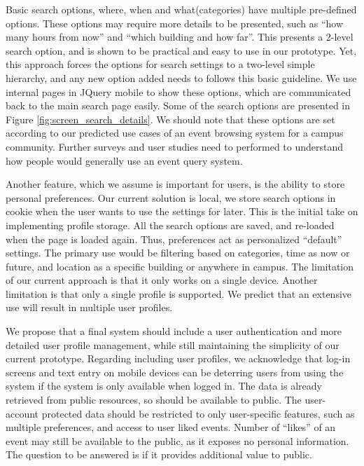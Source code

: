 \documentclass{acm_proc_article-sp}
\begin{document}
Basic search options, where, when and what(categories) have multiple pre-defined options.
These options may require more details to be presented, such as "`how many hours from now"' and "`which building and how far"'.
This presents a 2-level search option, and is shown to be practical and easy to use in our prototype.
Yet, this approach forces the options for search settings to a two-level simple hierarchy, and any new option added
  needs to follows this basic guideline.
We use internal pages in JQuery mobile to show these options, which are communicated back to the main search page easily.
Some of the search options are presented in Figure \ref{fig:screen_search_details}.
We should note that these options are set according to our predicted use cases of an event browsing system for a campus community.
Further surveys and user studies need to performed to understand how people would generally use an event query system.

Another feature, which we assume is important for users, is the ability to store personal preferences.
Our current solution is local, we store search options in cookie when the user wants to use the settings for later.
This is the initial take on implementing profile storage.
All the search options are saved, and re-loaded when the page is loaded again.
Thus, preferences act as personalized "`default"' settings.
The primary use would be filtering based on categories, time as now or future, and location as a specific building or 
  anywhere in campus.
The limitation of our current approach is that it only works on a single device.
Another limitation is that only a single profile is supported.
We predict that an extensive use will result in multiple user profiles.

We propose that a final system should include a user authentication and more detailed user profile management, while still
  maintaining the simplicity of our current prototype.
Regarding including user profiles, we acknowledge that log-in screens and text entry on mobile devices can be 
  deterring users from using the system if the system is only available when logged in.
The data is already retrieved from public resources, so should be available to public.
The user-account protected data should be restricted to only user-specific features, such as multiple preferences,
  and access to user liked events.
Number of "`likes"' of an event may still be available to the public, as it exposes no personal information.
The question to be answered is if it provides additional value to public.
\end{document}

